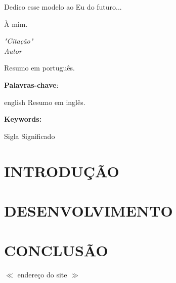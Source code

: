 \documentclass[12pt,a4paper,oneside]{abntex2}
\begin{document}
	\begin{dedicatoria}%
		\vspace*{\fill}
		\begin{flushright}
			Dedico esse modelo ao Eu do futuro...
		\end{flushright}
	\end{dedicatoria}

	\begin{agradecimentos}  %
		À mim.
	\end{agradecimentos}

	\begin{epigrafe} %
		\vspace*{\fill}
		\begin{flushright} %
			\textit{"Citação"\\Autor}
		\end{flushright} 
	\end{epigrafe}

	\begin{resumo}
		Resumo em português.
		
		\noindent \textbf{Palavras-chave}: 
	\end{resumo}
	
	\begin{resumo}[\normalsize \textbf{ABSTRACT}]
		
		\begin{otherlanguage*}{english}
			Resumo em inglês.
			
			\noindent \textbf{Keywords: }
		\end{otherlanguage*}

	\end{resumo}

	\listoffigures*
	\newpage
	\listoftables*
	\begin{siglas} %
		\item[Sigla] Significado
	\end{siglas}
	\tableofcontents* \thispagestyle{empty} %
	\mainmatter %
	
	\chapter{INTRODUÇÃO}
	\chapter{DESENVOLVIMENTO}
	\chapter{CONCLUSÃO}
	
	\begin{thebibliography}{1}
		  $\ll$ endereço do site $\gg$
	\end{thebibliography}
\end{document}
